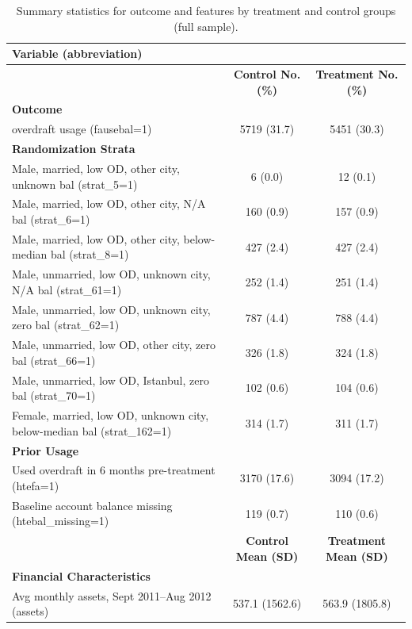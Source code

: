 \begin{landscape}
\begin{table}[ht]
\centering
\begin{threeparttable}
\scriptsize
\caption{Summary statistics for outcome and features by treatment and control groups (full sample).}
\label{tab:descriptive_lasso}
\begin{tabular*}{\columnwidth}{@{\extracolsep\fill}>{\raggedright\arraybackslash}p{9cm}cc@{\extracolsep\fill}}
\toprule
\textbf{Variable (abbreviation)} &   & \\
\midrule
& \textbf{Control No. (\%)}  & \textbf{Treatment No. (\%)}\\
\textbf{Outcome} & & \\
\quad overdraft usage (fausebal=1) & 5719 (31.7) & 5451 (30.3) \\
\addlinespace[0.3em]
\textbf{Randomization Strata} & & \\
\quad Male, married, low OD, other city, unknown bal (strat\_5=1) & 6 (0.0) & 12 (0.1) \\
\quad Male, married, low OD, other city, N/A bal (strat\_6=1) & 160 (0.9) & 157 (0.9) \\
\quad Male, married, low OD, other city, below-median bal (strat\_8=1) & 427 (2.4) & 427 (2.4) \\
\quad Male, unmarried, low OD, unknown city, N/A bal (strat\_61=1) & 252 (1.4) & 251 (1.4) \\
\quad Male, unmarried, low OD, unknown city, zero bal (strat\_62=1) & 787 (4.4) & 788 (4.4) \\
\quad Male, unmarried, low OD, other city, zero bal (strat\_66=1) & 326 (1.8) & 324 (1.8) \\
\quad Male, unmarried, low OD, Istanbul, zero bal (strat\_70=1) & 102 (0.6) & 104 (0.6) \\
\quad Female, married, low OD, unknown city, below-median bal (strat\_162=1) & 314 (1.7) & 311 (1.7) \\
\addlinespace[0.1em]
\textbf{Prior Usage} & & \\
\quad Used overdraft in 6 months pre-treatment (htefa=1) & 3170 (17.6) & 3094 (17.2) \\
\quad Baseline account balance missing (htebal\_missing=1) & 119 (0.7) & 110 (0.6) \\
\addlinespace[0.2em]
& \textbf{Control Mean (SD)} & \textbf{Treatment Mean (SD)} \\
\textbf{Financial Characteristics} & & \\
\quad Avg monthly assets, Sept 2011--Aug 2012 (assets) & 537.1 (1562.6) & 563.9 (1805.8) \\

\end{tabular*}
\end{threeparttable}
\end{table}
\end{landscape}
